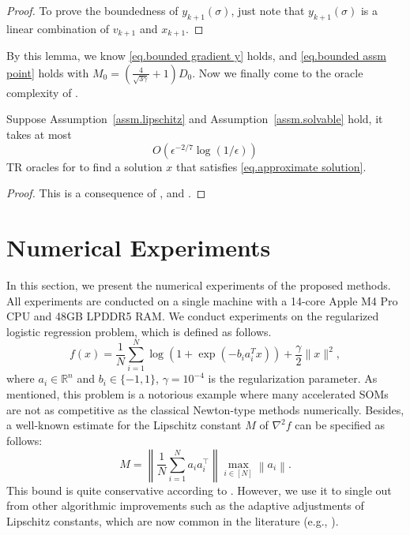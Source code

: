 \documentclass{mcom-l}
\numberwithin{equation}{section}
\begin{document}
\begin{proof}
    To prove the boundedness of $y_{k+1}(\sigma)$, just note that $y_{k+1}(\sigma)$ is a linear combination of $v_{k+1}$ and $x_{k+1}$.
\end{proof}
By this lemma, we know \eqref{eq.bounded gradient y} holds, and \eqref{eq.bounded assm point} holds with $M_0 =\left(\frac{4}{\sqrt{3\gamma}}+1\right)D_0 $. Now we finally come to the oracle complexity of .
\begin{theorem}
    \label{thm.final complexity of msatr}
    Suppose Assumption~\ref{assm.lipschitz} and Assumption~\ref{assm.solvable} hold, it takes at most
    \begin{equation}
        \label{eq.final complexity of msatr}
        O\left(\epsilon^{-2/7}\log\left(1/\epsilon\right)\right)
    \end{equation}
    TR oracles for  to find a solution $x$ that satisfies \eqref{eq.approximate solution}.
\end{theorem}
\begin{proof}
    This is a consequence of ,  and .
\end{proof}

\section{Numerical Experiments}\label{sec.experiments}
In this section, we present the numerical experiments of the proposed methods. All experiments are conducted on a single machine with a 14-core Apple M4 Pro CPU and 48GB LPDDR5 RAM.
We conduct experiments on the regularized logistic regression problem, which is defined as follows.
\begin{equation}
    \label{eq.logistic regression}
    f(x) = \frac{1}{N} \sum_{i=1}^N \log \left(1 + \exp \left(-b_i a_i^T x\right)\right) + \frac{\gamma}{2}\|x\|^2,
\end{equation}
where $a_i \in \mathbb{R}^n$ and $b_i \in \{-1, 1\}$, $\gamma = 10^{-4}$ is the regularization parameter.
As mentioned, this problem is a notorious example where many accelerated SOMs are not as competitive as the classical Newton-type methods \cite{carmon2022optimal,jiang2024accelerated,chen2022accelerating} numerically.
Besides, a well-known estimate for the Lipschitz constant $\widehat M$ of $\nabla^2 f$ can be specified as follows:
$$\widehat M = \left\|\frac{1}{N} \sum_{i=1}^N a_i a_i^{\top}\right\| \max _{i \in[N]}\left\|a_i\right\|.$$
This bound is quite conservative according to \cite{songUnifiedAccelerationHighorder2021}.
However, we use it to single out from other algorithmic improvements such as the adaptive adjustments of Lipschitz constants, which are now common in the literature (e.g., \cite{mishchenko_regularized_2023,cartis2011adaptive1}).
\end{document}
